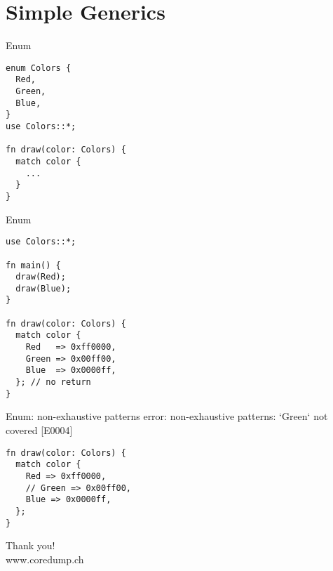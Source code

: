 \documentclass[aspectratio=1610,t]{beamer}
\begin{document}
\section{Simple Generics}
\begin{frame}[fragile]{Enum}
\begin{verbatim}
enum Colors {
  Red,
  Green,
  Blue,
}
use Colors::*;

fn draw(color: Colors) {
  match color {
    ...
  }
}
\end{verbatim}
\end{frame}

\begin{frame}[fragile]{Enum}
\begin{verbatim}
use Colors::*;

fn main() {
  draw(Red);
  draw(Blue);
}

fn draw(color: Colors) {
  match color {
    Red   => 0xff0000,
    Green => 0x00ff00,
    Blue  => 0x0000ff,
  }; // no return
}
\end{verbatim}
\end{frame}


\begin{frame}[fragile]{Enum: non-exhaustive patterns}
error: non-exhaustive patterns: `Green` not covered [E0004]
\begin{verbatim}
fn draw(color: Colors) {
  match color {
    Red => 0xff0000,
    // Green => 0x00ff00,
    Blue => 0x0000ff,
  };
}
\end{verbatim}
\end{frame}

%
%
%
%
%
%


{
\begin{frame}[standout]
	\begin{centering}
	{\Huge Thank you!}\\
	{\normalsize www.coredump.ch}
	\end{centering}
\end{frame}
}
\end{document}
